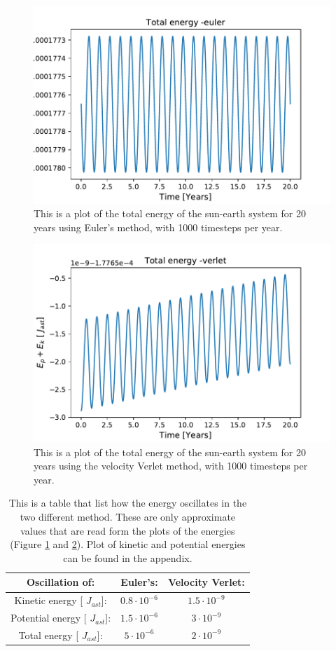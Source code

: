 \begin{figure}[H]
\includegraphics[width=0.9\linewidth]{../results/plots/totalenergy-euler.pdf}\caption{This is a plot of the total energy of the sun-earth system for 20 years using Euler's method, with 1000 timesteps per year.}\label{fig:totalenergy-euler}
\end{figure}	

\begin{figure}[H]
\includegraphics[width=0.9\linewidth]{../results/plots/totalenergy-verlet.pdf}\caption{This is a plot of the total energy of the sun-earth system for 20 years using the velocity Verlet method, with 1000 timesteps per year.}\label{fig:totalenergy-verlet}
\end{figure}

\begin{table}[H]\caption{This is a table that list how the energy oscillates in the two different method. These are only approximate values that are read form the plots of the energies (Figure \ref{fig:totalenergy-euler} and \ref{fig:totalenergy-verlet}). Plot of kinetic and potential energies can be found in the appendix.} \label{tab:energy_oscillations}
\begin{tabular}{ccc}
Oscillation of: & Euler's: & Velocity Verlet:\\ \hline
Kinetic energy [ $J_{ast}$]: & $0.8\cdot10^{-6}$ & $1.5 \cdot 10^{-9}$  \\
Potential energy [ $J_{ast}$]: & $1.5\cdot 10^{-6}$ & $3\cdot10^{-9}$  \\
Total energy [ $J_{ast}$]:  & $ 5 \cdot 10^{-6}$ & $2\cdot10^{-9}$ \\
\end{tabular}
\end{table}

